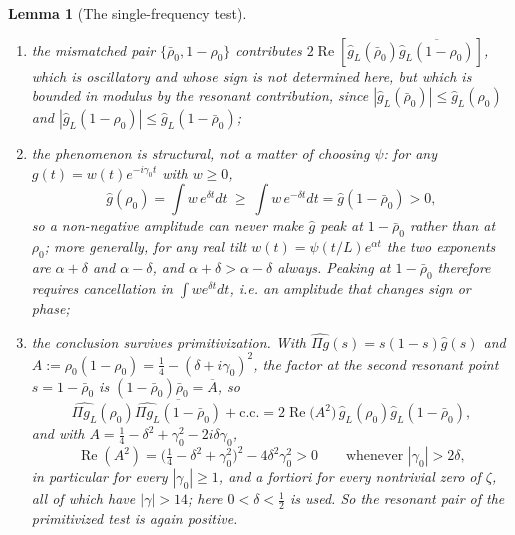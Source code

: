 \documentclass[11pt]{amsart}
\newtheorem{lemma}[theorem]{Lemma}
\theoremstyle{definition}
\theoremstyle{remark}
\newcommand{\Rel}{\operatorname{Re}}
\begin{document}
\begin{lemma}[The single-frequency test]
\begin{enumerate}
\item[(iii)] the mismatched pair $\{\bar\rho_0,1-\rho_0\}$ contributes
$2\Rel[\widehat g_L(\bar\rho_0)\overline{\widehat g_L(1-\rho_0)}]$, which is
oscillatory and whose sign is not determined here, but which is bounded in
modulus by the resonant contribution, since
$|\widehat g_L(\bar\rho_0)|\le\widehat g_L(\rho_0)$ and
$|\widehat g_L(1-\rho_0)|\le\widehat g_L(1-\bar\rho_0)$;
\item[(iv)] the phenomenon is structural, not a matter of choosing $\psi$: for
any $g(t)=w(t)e^{-i\gamma_0t}$ with $w\ge0$,
\[
  \widehat g(\rho_0)=\int w\,e^{\delta t}dt\ \ge\ \int w\,e^{-\delta t}dt
   =\widehat g(1-\bar\rho_0)>0,
\]
so a non-negative amplitude can never make $\widehat g$ peak at
$1-\bar\rho_0$ rather than at $\rho_0$; more generally, for any real tilt
$w(t)=\psi(t/L)e^{\alpha t}$ the two exponents are $\alpha+\delta$ and
$\alpha-\delta$, and $\alpha+\delta>\alpha-\delta$ always. Peaking at
$1-\bar\rho_0$ therefore requires cancellation in $\int we^{\delta t}dt$, i.e.
an amplitude that changes sign or phase;
\item[(v)] the conclusion survives primitivization. With
$\widehat{\Pi g}(s)=s(1-s)\widehat g(s)$ and
$A:=\rho_0(1-\rho_0)=\tfrac14-(\delta+i\gamma_0)^2$, the factor at the second
resonant point $s=1-\bar\rho_0$ is $(1-\bar\rho_0)\bar\rho_0=\overline A$, so
\[
  \widehat{\Pi g_L}(\rho_0)\overline{\widehat{\Pi g_L}(1-\bar\rho_0)}
   +\mathrm{c.c.}=2\Rel\bigl(A^2\bigr)\,
   \widehat g_L(\rho_0)\widehat g_L(1-\bar\rho_0),
\]
and with $A=\tfrac14-\delta^2+\gamma_0^2-2i\delta\gamma_0$,
\[
  \Rel(A^2)=\bigl(\tfrac14-\delta^2+\gamma_0^2\bigr)^2-4\delta^2\gamma_0^2>0
  \qquad\text{whenever }|\gamma_0|>2\delta,
\]
in particular for every $|\gamma_0|\ge1$, and a fortiori for every nontrivial
zero of $\zeta$, all of which have $|\gamma|>14$; here $0<\delta<\tfrac12$ is
used. So the resonant pair of the primitivized test is again positive.
\end{enumerate}
\end{lemma}
\end{document}
